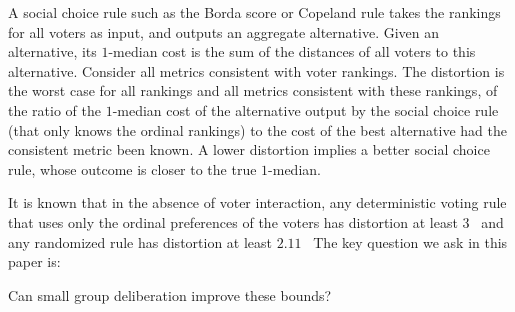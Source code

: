 A social choice rule such as the Borda score or Copeland rule takes the rankings for all voters as input, and outputs an aggregate alternative. %
 Given an alternative, its $1$-median cost is the sum of the distances of all voters to this alternative. Consider all metrics consistent with voter rankings. The distortion is the worst case for all rankings and all metrics consistent with these rankings, of the ratio of the $1$-median cost of the alternative output by the social choice rule (that only knows the ordinal rankings) to the cost of the best alternative had the consistent metric been known. A lower distortion implies a better social choice rule, whose outcome is closer to the true $1$-median.

It is known that in the absence of voter interaction, any deterministic voting rule that uses only the ordinal preferences of the voters has distortion at least $3$~\cite{AnshelevichBEPS18} %
and any randomized rule has distortion at least $2.11$~\cite{AnshelevichP17,CharikarR22} %
 The key question we ask in this paper is:

\begin{question}
\label{q1}
Can small group deliberation improve these bounds?
\end{question}




